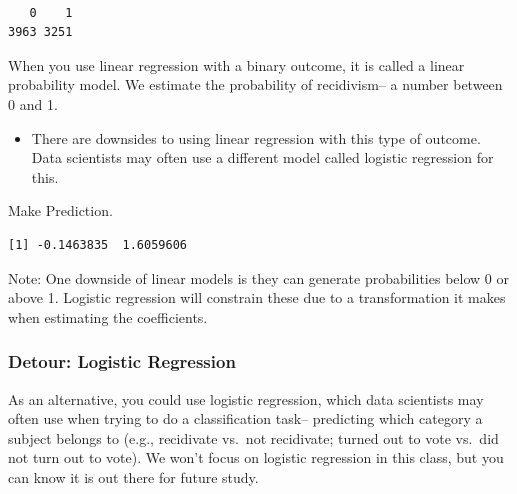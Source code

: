 \documentclass[
  letterpaper,
  DIV=11,
  numbers=noendperiod]{scrreprt}
\newenvironment{Shaded}{\begin{snugshade}}{\end{snugshade}}
\newcommand{\DocumentationTok}[1]{\textcolor[rgb]{0.37,0.37,0.37}{\textit{#1}}}
\newcommand{\FunctionTok}[1]{\textcolor[rgb]{0.28,0.35,0.67}{#1}}
\newcommand{\NormalTok}[1]{\textcolor[rgb]{0.00,0.23,0.31}{#1}}
\newcommand{\OtherTok}[1]{\textcolor[rgb]{0.00,0.23,0.31}{#1}}
\newcommand{\SpecialCharTok}[1]{\textcolor[rgb]{0.37,0.37,0.37}{#1}}
\providecommand{\tightlist}{%
  \setlength{\itemsep}{0pt}\setlength{\parskip}{0pt}}\usepackage{longtable,booktabs,array}
\begin{document}
\begin{verbatim}

   0    1 
3963 3251 
\end{verbatim}

When you use linear regression with a binary outcome, it is called a
linear probability model. We estimate the probability of recidivism-- a
number between 0 and 1.

\begin{itemize}
\tightlist
\item
  There are downsides to using linear regression with this type of
  outcome. Data scientists may often use a different model called
  logistic regression for this.
\end{itemize}

Make Prediction.

\begin{Shaded}
\end{Shaded}

\begin{verbatim}
[1] -0.1463835  1.6059606
\end{verbatim}

Note: One downside of linear models is they can generate probabilities
below 0 or above 1. Logistic regression will constrain these due to a
transformation it makes when estimating the coefficients.

\hypertarget{detour-logistic-regression}{%
\subsubsection{Detour: Logistic
Regression}\label{detour-logistic-regression}}

As an alternative, you could use logistic regression, which data
scientists may often use when trying to do a classification task--
predicting which category a subject belongs to (e.g., recidivate vs.~not
recidivate; turned out to vote vs.~did not turn out to vote). We won't
focus on logistic regression in this class, but you can know it is out
there for future study.
\end{document}
